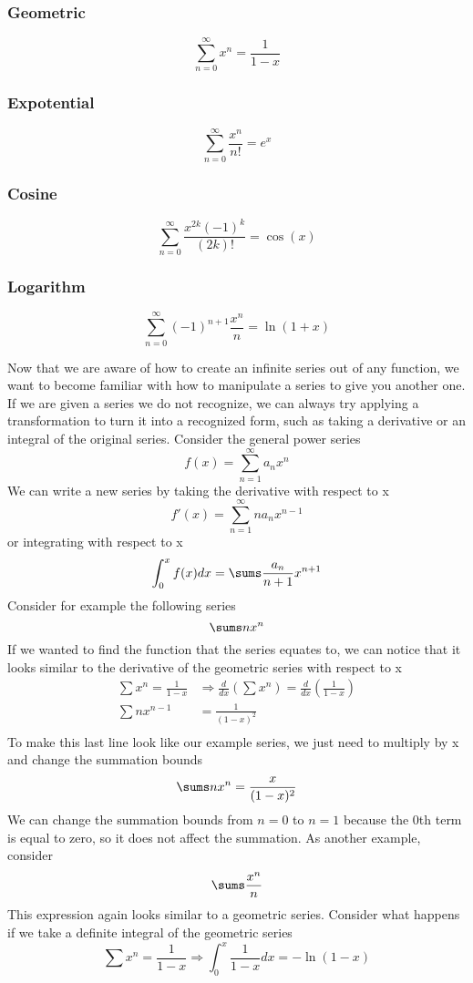 \documentclass{article}
\newcommand{\be}{\begin{equation}}
\newcommand{\ee}{\end{equation}}
\newcommand{\sumzero}{\sum_{n=0}^\infty}
\newcommand{\sumone}{\sum_{n=1}^\infty}
\begin{document}
\subsubsection*{Geometric}
\be
\sumzero x^n = \frac{1}{1-x}
\ee

\subsubsection*{Expotential}
\be
\sumzero \frac{x^n}{n!} = e^x
\ee

\subsubsection*{Cosine}
\be
\sumzero \frac{x^{2k}(-1)^k}{(2k)!} = \cos(x)
\ee

\subsubsection*{Logarithm}
\be
\sumzero (-1)^{n+1} \frac{x^n}{n} = \ln(1+x)
\ee

Now that we are aware of how to create an infinite series out of any function, we want to become familiar with how to manipulate a series to give you another one.
If we are given a series we do not recognize, we can always try applying a transformation to turn it into a recognized form, such as taking a derivative or an integral of the original series.
Consider the general power series
\be
f(x) = \sumone a_nx^n
\ee
We can write a new series by taking the derivative with respect to x
\be
f'(x) = \sumone na_nx^{n-1}
\ee
or integrating with respect to x
\be
\int_{0}^{x} f(x) dx = \sums \frac{a_n}{n+1}x^{n+1}
\ee
Consider for example the following series
\be
\sums nx^n
\ee
If we wanted to find the function that the series equates to, we can notice that it looks similar to the derivative of the geometric series with respect to x
\be
\begin{split}
	\sum x^n = \frac{1}{1-x} &\Rightarrow \frac{d}{dx} \left( \sum x^n\right) = \frac{d}{dx} \left( \frac{1}{1-x} \right)\\
	\sum nx^{n-1} &= \frac{1}{(1-x)^2} \\
\end{split}
\ee
To make this last line look like our example series, we just need to multiply by x and change the summation bounds
\be
\sums nx^n = \frac{x}{(1-x)^2}
\ee
We can change the summation bounds from $n = 0$ to $n = 1$ because the 0th term is equal to zero, so it does not affect the summation.
As another example, consider
\be
\sums \frac{x^n}{n}
\ee
This expression again looks similar to a geometric series.
Consider what happens if we take a definite integral of the geometric series
\be
\sum x^n = \frac{1}{1-x} \Rightarrow \int_{0}^{x} \frac{1}{1-x} dx = - \ln(1 - x)
\ee
\end{document}
